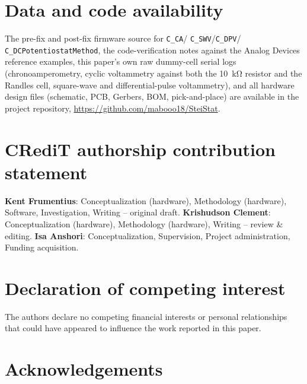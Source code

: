 \documentclass[preprint,12pt]{elsarticle}
\begin{document}
\section*{Data and code availability}
The pre-fix and post-fix firmware source for \texttt{C\_CA}/\allowbreak
\texttt{C\_SWV}/\allowbreak\texttt{C\_DPV}/\allowbreak
\texttt{C\_DCPotentiostatMethod}, the code-verification notes
against the Analog Devices reference examples, this paper's own raw
dummy-cell serial logs (chronoamperometry, cyclic voltammetry against both
the \SI{10}{\kilo\ohm} resistor and the Randles cell, square-wave and
differential-pulse voltammetry), and all hardware design files (schematic,
PCB, Gerbers, BOM, pick-and-place) are available in the project repository,
\url{https://github.com/mabooo18/SteiStat}.

\section*{CRediT authorship contribution statement}
\textbf{Kent Frumentius}: Conceptualization (hardware), Methodology
(hardware), Software, Investigation, Writing -- original draft.
\textbf{Krishudson Clement}: Conceptualization (hardware), Methodology
(hardware), Writing -- review \& editing.
\textbf{Isa Anshori}: Conceptualization, Supervision, Project
administration, Funding acquisition.

\section*{Declaration of competing interest}
The authors declare no competing financial interests or personal relationships
that could have appeared to influence the work reported in this paper.

\section*{Acknowledgements}



\end{document}
